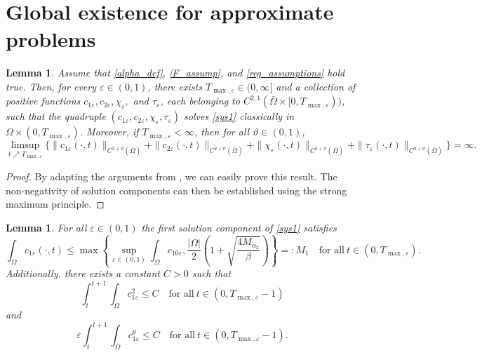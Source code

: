 \documentclass[a4paper,10pt]{article}
\newtheorem{Lemma}[Theorem]{Lemma}
\theoremstyle{definition}
\begin{document}
\section{Global existence for approximate problems}\label{sec:GE_approx}
\begin{Lemma}
\label{lemma_loc_ext}
Assume that \eqref{alpha_def}, \eqref{F_assump}, and \eqref{reg_assumptions} hold true. Then, for every $\varepsilon \in (0, 1)$, there exists $T_{\max, \varepsilon} \in (0, \infty]$ and a collection of positive functions $c_{1\varepsilon}, c_{2\varepsilon}, \chi_\varepsilon,$ and $\tau_\varepsilon$, each belonging to $C^{2,1}(\bar{\Omega} \times [0, T_{\max, \varepsilon}))$, such that the quadruple $(c_{1\varepsilon}, c_{2\varepsilon}, \chi_\varepsilon, \tau_\varepsilon)$ solves \eqref{sys1} classically in $\Omega \times (0, T_{\max, \varepsilon})$.  Moreover, if $T_{\max, \varepsilon} < \infty$, then for all $\vartheta \in (0, 1)$,
\begin{equation}
\label{exten_criteria}
\limsup_{t \nearrow T_{\max, \varepsilon}} \Big\{\|c_{1\varepsilon}(\cdot, t)\|_{C^{2 + \vartheta}(\bar{\Omega})}
+ \|c_{2\varepsilon}(\cdot, t)\|_{C^{2 + \vartheta}(\bar{\Omega})}
+ \|\chi_{\varepsilon}(\cdot, t)\|_{C^{2 + \vartheta}(\bar{\Omega})}
+ \|\tau_{\varepsilon}(\cdot, t)\|_{C^{2 + \vartheta}(\bar{\Omega})} \Big\} = \infty.
\end{equation}
\end{Lemma}
\begin{proof}
By adapting the arguments from \cite[Lemma 3.1]{stinner2014global}, we can easily prove this result. The non-negativity of solution components can then be established using the strong maximum principle.
\end{proof}

\begin{Lemma}
\label{lemmal1c1}
  For all $\varepsilon \in (0, 1)$ the first solution component of \eqref{sys1} satisfies
  \begin{equation}
    \label{l1c1}
    \int_\Omega c_{1\varepsilon}(\cdot, t) \leq \max\left\{\sup_{\varepsilon \in (0, 1)}\int_\Omega c_{10\varepsilon}, \frac{|\Omega|}{2} \left(1 + \sqrt{\frac{4 M_{\alpha_2}}{\beta}}\right)\right\} =: M_1 \quad \text{for all}~ t \in (0,T_{\max, \varepsilon}).
  \end{equation}
  Additionally, there exists a constant $C > 0$ such that
  \begin{equation}
  \label{c1_bound1}
    \int_t^{t + 1} \int_\Omega c_{1\varepsilon}^2 \leq C \quad \text{for all} ~ t \in (0, T_{\max, \varepsilon} - 1)
  \end{equation}
  and
   \begin{equation}
   \label{c1_bound2}
    \varepsilon \int_t^{t + 1} \int_\Omega c_{1\varepsilon}^\theta \leq C  \quad \text{for all} ~ t \in (0, T_{\max, \varepsilon} - 1).
  \end{equation}
\end{Lemma}
\end{document}
